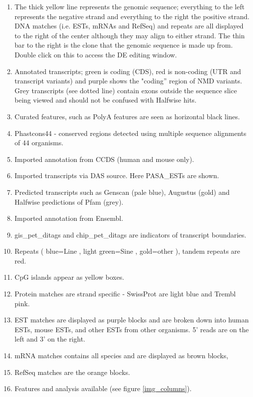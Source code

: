 \documentclass[letterpaper]{article}
\begin{document}
\begin{enumerate}
\item  The thick yellow line represents the genomic sequence; everything to the left represents the negative strand and everything to the right the positive strand. DNA matches (i.e. ESTs, mRNAs and RefSeq) and repeats are all displayed to the right of the center although they may align to either strand. The thin bar to the right is the clone that the genomic sequence is made up from. Double click on this to access the DE editing window.
\item  Annotated transcripts; green is coding (CDS), red is non-coding (UTR and transcript variants) and purple shows the "coding'' region of NMD variants. Grey transcripts (see dotted line) contain exons outside the sequence slice being viewed and should not be confused with Halfwise hits.
\item  Curated features, such as PolyA features are seen as horizontal black lines.
\item  Phastcons44 - conserved regions detected using multiple sequence alignments of 44 organisms.
\item  Imported annotation from CCDS (human and mouse only).
\item  Imported transcripts via DAS source. Here PASA\_ESTs are shown.
\item  Predicted transcripts such as Genscan (pale blue), Augustus (gold) and Halfwise predictions of Pfam (grey).
\item  Imported annotation from Ensembl.
\item  gis\_pet\_ditags and chip\_pet\_ditags are indicators of transcript boundaries.
\item Repeats ( blue=Line , light green=Sine , gold=other ), tandem repeats are red.
\item CpG islands appear as yellow boxes.
\item Protein matches are strand specific - SwissProt are light blue and Trembl pink.
\item EST matches are displayed as purple blocks and are broken down into human ESTs, mouse ESTs, and other ESTs from other organisms. 5' reads are on the left and 3' on the right.
\item mRNA matches contains all species and are displayed as brown blocks,
\item RefSeq matches are the orange blocks.
\item Features and analysis available (see figure \ref{img_columns}).
\end{enumerate}
\end{document}
